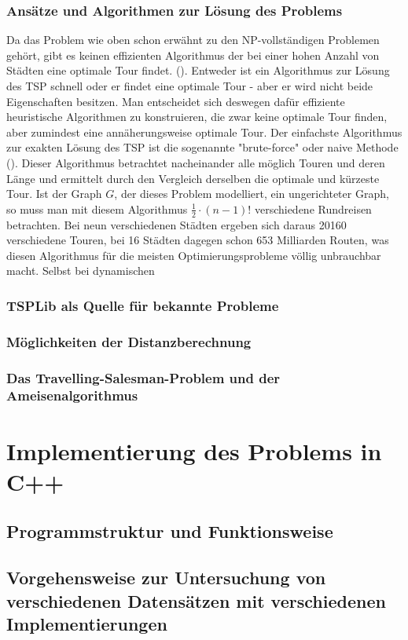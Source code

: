 \documentclass[doktyp=barbeit, sprache=german]{TUBAFarbeiten}
\begin{document}
\subsubsection{Ansätze und Algorithmen zur Lösung des Problems}
Da das Problem wie oben schon erwähnt zu den NP-vollständigen Problemen gehört, gibt es keinen effizienten Algorithmus der bei einer hohen Anzahl von Städten eine optimale Tour findet. (\cite[p.~150]{TSP}). Entweder ist ein Algorithmus zur Lösung des TSP schnell oder er findet eine optimale Tour - aber er wird nicht beide Eigenschaften besitzen. Man entscheidet sich deswegen dafür effiziente heuristische Algorithmen zu konstruieren, die zwar keine optimale Tour finden, aber zumindest eine annäherungsweise optimale Tour.
Der einfachste Algorithmus zur exakten Lösung des TSP ist die sogenannte "brute-force" oder naive Methode (\cite{TaschenbuchAlgorithmen}). Dieser Algorithmus betrachtet nacheinander alle möglich Touren und deren Länge und ermittelt durch den Vergleich derselben die optimale und kürzeste Tour. 
Ist der Graph \(G\), der dieses Problem modelliert, ein ungerichteter Graph, so muss man mit diesem Algorithmus \(\frac{1}{2} \cdot (n - 1)!\) verschiedene Rundreisen betrachten. Bei neun verschiedenen Städten ergeben sich daraus 20160 verschiedene Touren, bei 16 Städten dagegen schon 653 Milliarden Routen, was diesen Algorithmus für die meisten Optimierungsprobleme völlig unbrauchbar macht. Selbst bei dynamischen 
\subsubsection{TSPLib als Quelle für bekannte Probleme}
\subsubsection{Möglichkeiten der Distanzberechnung}
\subsubsection{Das Travelling-Salesman-Problem und der Ameisenalgorithmus}
\section{Implementierung des Problems in C++}
\subsection{Programmstruktur und Funktionsweise}
\subsection{Vorgehensweise zur Untersuchung von verschiedenen Datensätzen mit verschiedenen Implementierungen}
\end{document}
